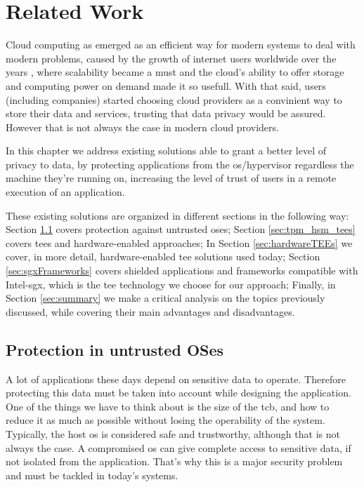 \chapter{Related Work}
\label{cha:related_work}

Cloud computing as emerged as an efficient way for modern systems to deal with modern problems, caused by the growth of internet users worldwide over the years \cite{growthInternetUsers}, where scalability became a must and the cloud's ability to offer storage and computing power on demand made it so usefull.
With that said, users (including companies) started choosing cloud providers as a convinient way to store their data and services, trusting that data privacy would be assured. However that is not always the case in modern cloud providers. 

In this chapter we address existing solutions able to grant a better level of privacy to data, by protecting applications from the \gls{os}/hypervisor regardless the machine they're running on, increasing the level of trust of users in a remote execution of an application.

These existing solutions are organized in different sections in the following way: 
Section \ref{sec:protect_untrustOS} covers protection against untrusted \gls{os}es; 
Section \ref{sec:tpm_hsm_tees} covers \gls{tee}s and hardware-enabled approaches;
In Section \ref{sec:hardwareTEEs} we cover, in more detail, hardware-enabled \gls{tee} solutions used today;
Section \ref{sec:sgxFrameworks} covers shielded applications and frameworks compatible with Intel-\gls{sgx}, which is the \gls{tee} technology we choose for our approach;
Finally, in Section \ref{sec:summary} we make a critical analysis on the topics previously discussed, while covering their main advantages and disadvantages.




\section{Protection in untrusted OSes}
\label{sec:protect_untrustOS}

A lot of applications these days depend on sensitive data to operate. Therefore protecting this data must be taken into account while designing the application. 
One of the things we have to think about is the size of the \gls{tcb}, and how to reduce it as much as possible without losing the operability of the system. 
Typically, the host \gls{os} is considered safe and trustworthy, although that is not always the case. A compromised \gls{os} can give complete access to sensitive data, if not isolated from the application. That’s why this is a major security problem and must be tackled in today’s systems.

